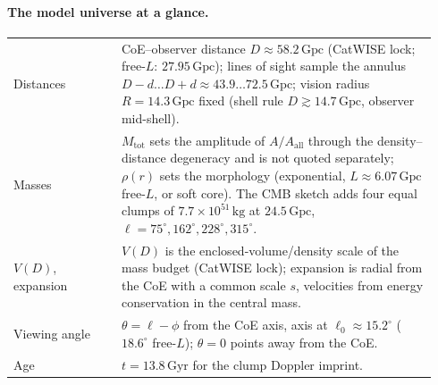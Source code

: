 \documentclass[11pt,a4paper]{article}
\begin{document}
\paragraph{The model universe at a glance.}
\begin{center}\footnotesize
\begin{tabular}{@{}p{0.24\linewidth}p{0.70\linewidth}@{}}
\toprule
Distances & CoE--observer distance \(D\approx58.2\,\mathrm{Gpc}\) (CatWISE lock; free-\(L\): \(27.95\,\mathrm{Gpc}\)); lines of sight sample the annulus \(D{-}d\ldots D{+}d\approx43.9\ldots72.5\,\mathrm{Gpc}\); vision radius \(R=14.3\,\mathrm{Gpc}\) fixed (shell rule \(D\gtrsim14.7\,\mathrm{Gpc}\), observer mid-shell). \\
Masses & \(M_{\mathrm{tot}}\) sets the amplitude of \(A/A_{\mathrm{all}}\) through the density--distance degeneracy and is not quoted separately; \(\rho(r)\) sets the morphology (exponential, \(L\approx6.07\,\mathrm{Gpc}\) free-\(L\), or soft core). The CMB sketch adds four equal clumps of \(7.7\times10^{51}\,\mathrm{kg}\) at \(24.5\,\mathrm{Gpc}\), \(\ell=75^\circ,162^\circ,228^\circ,315^\circ\). \\
\(V(D)\), expansion & \(V(D)\) is the enclosed-volume/density scale of the mass budget (CatWISE lock); expansion is radial from the CoE with a common scale \(s\), velocities from energy conservation in the central mass. \\
Viewing angle & \(\theta=\ell-\phi\) from the CoE axis, axis at \(\ell_0\approx15.2^\circ\) (\(18.6^\circ\) free-\(L\)); \(\theta=0\) points away from the CoE. \\
Age & \(t=13.8\,\mathrm{Gyr}\) for the clump Doppler imprint. \\
\bottomrule
\end{tabular}
\end{center}

\FloatBarrier
\clearpage
\appendix
\renewcommand{\thefigure}{A\arabic{figure}}
\setcounter{figure}{0}
\captionsetup{skip=2pt,font=footnotesize,labelfont=bf}
\end{document}

